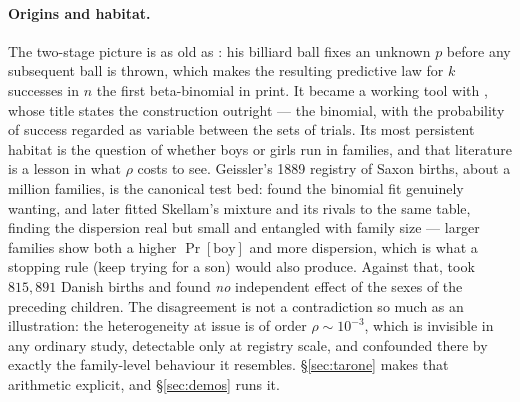 \documentclass[11pt]{article}
\numberwithin{equation}{section}
\begin{document}
\paragraph{Origins and habitat.}
The two-stage picture is as old as \citet{bayes1763}: his billiard ball
fixes an unknown $p$ before any subsequent ball is thrown, which makes
the resulting predictive law for $k$ successes in $n$ the first
beta-binomial in print.  It became a working tool with
\citet{skellam1948}, whose title states the construction outright --- the
binomial, with the probability of success regarded as variable between
the sets of trials.  Its most persistent habitat is the question of
whether boys or girls run in families, and that literature is a lesson in
what $\rho$ costs to see.  Geissler's 1889 registry of Saxon births,
about a million families, is the canonical test bed: \citet{edwards1958}
found the binomial fit genuinely wanting, and \citet{lindsey1998} later
fitted Skellam's mixture and its rivals to the same table, finding the
dispersion real but small and entangled with family size --- larger
families show both a higher $\Pr[\text{boy}]$ and more dispersion, which
is what a stopping rule (keep trying for a son) would also produce.
Against that, \citet{jacobsen1999} took $815{,}891$ Danish births and
found \emph{no} independent effect of the sexes of the preceding
children.  The disagreement is not a contradiction so much as an
illustration: the heterogeneity at issue is of order $\rho\sim10^{-3}$,
which is invisible in any ordinary study, detectable only at registry
scale, and confounded there by exactly the family-level behaviour it
resembles.  \S\ref{sec:tarone} makes that arithmetic explicit, and
\S\ref{sec:demos} runs it.
\end{document}
